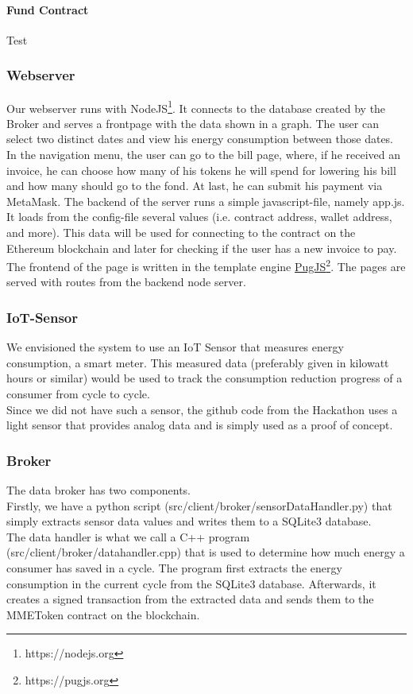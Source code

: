 \documentclass[11pt]{article}
\begin{document}
\paragraph{Fund Contract}
Test\\


\subsubsection{Webserver}
Our webserver runs  with NodeJS\footnote{https://nodejs.org}. It connects to the database created by the Broker and serves a frontpage with the data shown in a graph. The user can select two distinct dates and view his energy consumption between those dates. In the navigation menu, the user can go to the bill page, where, if he received an invoice, he can choose how many of his tokens he will spend for lowering his bill and how many should go to the fond. At last, he can submit his payment via MetaMask. The backend of the server runs a simple javascript-file, namely app.js. It loads from the config-file several values (i.e. contract address, wallet address, and more). This data will be used for connecting to the contract on the Ethereum blockchain and later for checking if the user has a new invoice to pay. The frontend of the page is written in the template engine \hyperref[https://pugjs.org]{PugJS}\footnote{https://pugjs.org}. The pages are served with routes from the backend node server.


\subsubsection{IoT-Sensor}
We envisioned the system to use an IoT Sensor that measures energy consumption, a smart meter. This measured data (preferably given in kilowatt hours or similar) would be used to track the consumption reduction progress of a consumer from cycle to cycle. \\
Since we did not have such a sensor, the github code from the Hackathon uses a light sensor that provides analog data and is simply used as a proof of concept.


\subsubsection{Broker}
The data broker has two components. \\
Firstly, we have a python script (src/client/broker/sensorDataHandler.py) that simply extracts sensor data values and writes them to a SQLite3 database. \\
The data handler is what we call a C++ program (src/client/broker/datahandler.cpp) that is used to determine how much energy a consumer has saved in a cycle. The program first extracts the energy consumption in the current cycle from the SQLite3 database. Afterwards, it creates a signed transaction from the extracted data and sends them to the MMEToken contract on the blockchain.
\end{document}
